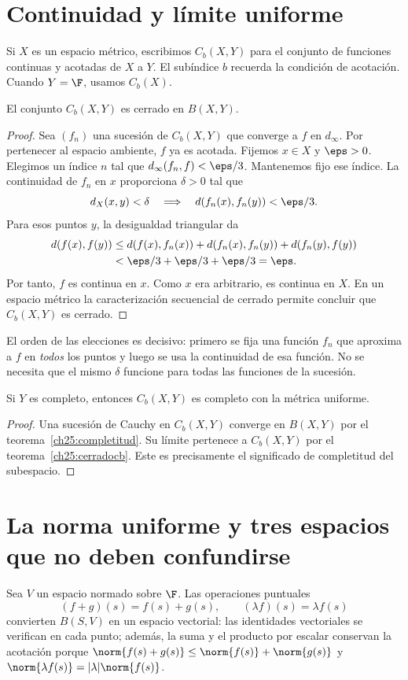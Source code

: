 \section{Continuidad y límite uniforme}
Si $X$ es un espacio métrico, escribimos $C_b(X,Y)$ para el conjunto de funciones continuas y acotadas de $X$ a $Y$. El subíndice $b$ recuerda la condición de acotación. Cuando $Y=\F$, usamos $C_b(X)$.

\begin{teorema}\label{ch25:cerradocb}
El conjunto $C_b(X,Y)$ es cerrado en $B(X,Y)$.
\end{teorema}
\begin{proof}
Sea $(f_n)$ una sucesión de $C_b(X,Y)$ que converge a $f$ en $d_\infty$. Por pertenecer al espacio ambiente, $f$ ya es acotada. Fijemos $x\in X$ y $\eps>0$. Elegimos un índice $n$ tal que $d_\infty(f_n,f)<\eps/3$. Mantenemos fijo ese índice. La continuidad de $f_n$ en $x$ proporciona $\delta>0$ tal que
\[
 d_X(x,y)<\delta\quad\Longrightarrow\quad d(f_n(x),f_n(y))<\eps/3.
\]
Para esos puntos $y$, la desigualdad triangular da
\[
 \begin{split}
 d(f(x),f(y))&\le d(f(x),f_n(x))+d(f_n(x),f_n(y))+d(f_n(y),f(y))\\
 &<\eps/3+\eps/3+\eps/3=\eps.
 \end{split}
\]
Por tanto, $f$ es continua en $x$. Como $x$ era arbitrario, es continua en $X$. En un espacio métrico la caracterización secuencial de cerrado permite concluir que $C_b(X,Y)$ es cerrado.
\end{proof}

El orden de las elecciones es decisivo: primero se fija una función $f_n$ que aproxima a $f$ en \emph{todos} los puntos y luego se usa la continuidad de esa función. No se necesita que el mismo $\delta$ funcione para todas las funciones de la sucesión.

\begin{corolario}
Si $Y$ es completo, entonces $C_b(X,Y)$ es completo con la métrica uniforme.
\end{corolario}
\begin{proof}
Una sucesión de Cauchy en $C_b(X,Y)$ converge en $B(X,Y)$ por el teorema~\ref{ch25:completitud}. Su límite pertenece a $C_b(X,Y)$ por el teorema~\ref{ch25:cerradocb}. Este es precisamente el significado de completitud del subespacio.
\end{proof}

\section{La norma uniforme y tres espacios que no deben confundirse}
Sea $V$ un espacio normado sobre $\F$. Las operaciones puntuales
\[
 (f+g)(s)=f(s)+g(s),\qquad (\lambda f)(s)=\lambda f(s)
\]
convierten $B(S,V)$ en un espacio vectorial: las identidades vectoriales se verifican en cada punto; además, la suma y el producto por escalar conservan la acotación porque
$\norm{f(s)+g(s)}\le\norm{f(s)}+\norm{g(s)}$ y $\norm{\lambda f(s)}=|\lambda|\norm{f(s)}$.

